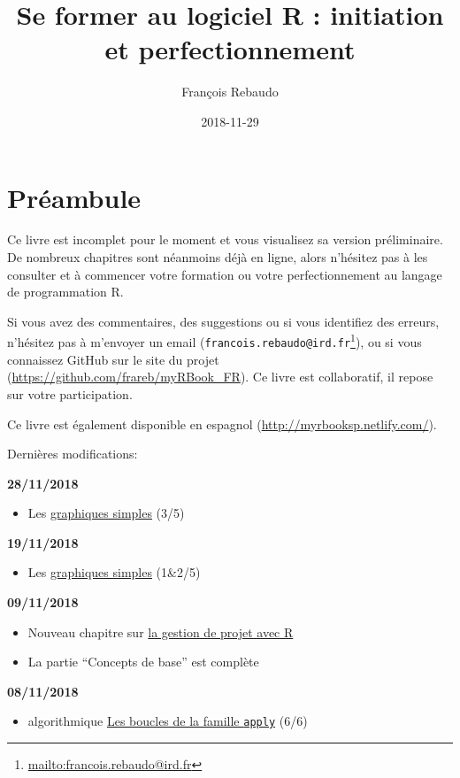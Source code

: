 \documentclass[]{book}
\title{Se former au logiciel R : initiation et perfectionnement}
\author{François Rebaudo}
\date{2018-11-29}
\providecommand{\tightlist}{%
  \setlength{\itemsep}{0pt}\setlength{\parskip}{0pt}}
\let\rmarkdownfootnote\footnote%
\def\footnote{\protect\rmarkdownfootnote}
\renewcommand{\href}[2]{#2\footnote{\url{#1}}}
\theoremstyle{definition}
\theoremstyle{definition}
\theoremstyle{definition}
\theoremstyle{remark}
\begin{document}
\maketitle

{
\setcounter{tocdepth}{1}
\tableofcontents
}
\chapter{Préambule}\label{preambule}

Ce livre est incomplet pour le moment et vous visualisez sa version
préliminaire. De nombreux chapitres sont néanmoins déjà en ligne, alors
n'hésitez pas à les consulter et à commencer votre formation ou votre
perfectionnement au langage de programmation R.

Si vous avez des commentaires, des suggestions ou si vous identifiez des
erreurs, n'hésitez pas à m'envoyer un email
(\href{mailto:francois.rebaudo@ird.fr}{\nolinkurl{francois.rebaudo@ird.fr}}),
ou si vous connaissez GitHub sur le site du projet
(\url{https://github.com/frareb/myRBook_FR}). Ce livre est collaboratif,
il repose sur votre participation.

Ce livre est également disponible en espagnol
(\url{http://myrbooksp.netlify.com/}).

Dernières modifications:

\textbf{28/11/2018}

\begin{itemize}
\tightlist
\item
  Les \protect\hyperlink{graph1}{graphiques simples} (3/5)
\end{itemize}

\textbf{19/11/2018}

\begin{itemize}
\tightlist
\item
  Les \protect\hyperlink{graph1}{graphiques simples} (1\&2/5)
\end{itemize}

\textbf{09/11/2018}

\begin{itemize}
\tightlist
\item
  Nouveau chapitre sur \protect\hyperlink{project}{la gestion de projet
  avec R}
\item
  La partie ``Concepts de base'' est complète
\end{itemize}

\textbf{08/11/2018}

\begin{itemize}
\tightlist
\item
  algorithmique \protect\hyperlink{l17applyfamily}{Les boucles de la
  famille \texttt{apply}} (6/6)
\end{itemize}
\end{document}
